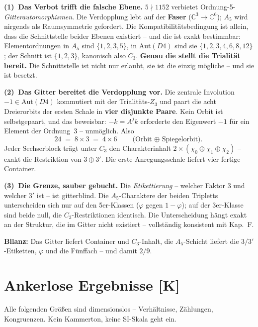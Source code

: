 \textbf{(1)~Das Verbot trifft die falsche Ebene.} $5\nmid1152$
verbietet Ordnung-5-\emph{Gitterautomorphismen}. Die Verdopplung
lebt auf der \textbf{Faser} ($\mathbb{C}^3\to\mathbb{C}^6$); $A_5$
wird nirgends als Raumsymmetrie gefordert. Die Kompatibilitäts\-bedingung
ist allein, dass die Schnittstelle beider Ebenen existiert -- und
die ist exakt bestimmbar: Elementordnungen in $A_5$ sind
$\{1,2,3,5\}$, in $\text{Aut}(D4)$ sind sie
$\{1,2,3,4,6,8,12\}$; der Schnitt ist $\{1,2,3\}$, kanonisch
also $C_3$. \textbf{Genau die stellt die Trialität bereit.} Die
Schnittstelle ist nicht nur erlaubt, sie ist die einzig mögliche --
und sie ist besetzt.

\textbf{(2)~Das Gitter bereitet die Verdopplung vor.} Die zentrale
Involution $-1 \in \text{Aut}(D4)$ kommutiert mit der
Trialitäts-$Z_3$ und paart die acht Dreierorbits der ersten Schale
in \textbf{vier disjunkte Paare}. Kein Orbit ist selbstgepaart, und
das beweisbar: $-k = A^j k$ erforderte den Eigenwert $-1$ für ein
Element der Ordnung~3 -- unmöglich. Also
\begin{equation}
  24 \;=\; 8\times3 \;=\; 4\times6
  \qquad\text{(Orbit $\oplus$ Spiegelorbit).}
\end{equation}
Jeder Sechserblock trägt unter $C_3$ den Charakterinhalt
$2\times(\chi_0\oplus\chi_1\oplus\chi_2)$ -- exakt die Restriktion
von $3\oplus3'$. Die erste Anregungsschale liefert vier fertige
Container.

\textbf{(3)~Die Grenze, sauber gebucht.} Die \emph{Etikettierung} --
welcher Faktor $3$ und welcher $3'$ ist -- ist gitterblind. Die
$A_5$-Charaktere der beiden Tripletts unterscheiden sich nur auf den
5er-Klassen ($\varphi$ gegen $1-\varphi$); auf der 3er-Klasse sind
beide null, die $C_3$-Restriktionen identisch. Die Unterscheidung
hängt exakt an der Struktur, die im Gitter nicht existiert --
vollständig konsistent mit Kap.~F.

\textbf{Bilanz:} Das Gitter liefert Container und $C_3$-Inhalt, die
$A_5$-Schicht liefert die $3/3'$-Etiketten, $\varphi$ und die
Fünffach -- und damit $2/9$.

\chapter{Ankerlose Ergebnisse [K]}

Alle folgenden Größen sind dimensionslos -- Verhältnisse, Zählungen,
Kongruenzen. Kein Kammerton, keine SI-Skala geht ein.


